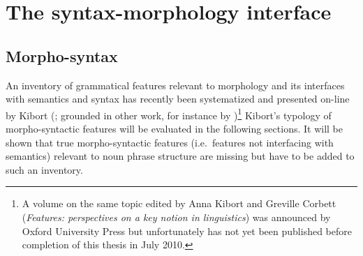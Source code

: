 %
%          
%
%
%
%
%
%
%
%
%          
%
%
%

\chapter{The syntax-morphology interface} \label{syntax-morphology-interface}

\section{Morpho-syntax}

An inventory of grammatical features relevant to morphology and its interfaces with semantics and syntax has recently been systematized and presented on-line by Kibort (\citeyear{kibort2008a}; grounded in other work, for instance by \citealt{aronoff1994,corbett1987,carstairs-mccarthy1999,corbett2006,corbett-etal2006,bickel-etal2007})\footnote{A volume on the same topic edited by Anna Kibort and Greville Corbett (\emph{Features: perspectives on a key notion in linguistics}) was announced by Oxford University Press but unfortunately has not yet been published before completion of this thesis in July 2010.} Kibort's typology of morpho-syntactic features will be evaluated in the following sections. It will be shown that true morpho-syntactic features (i.e.~features not interfacing with semantics) relevant to noun phrase structure are missing but have to be added to such an inventory.

